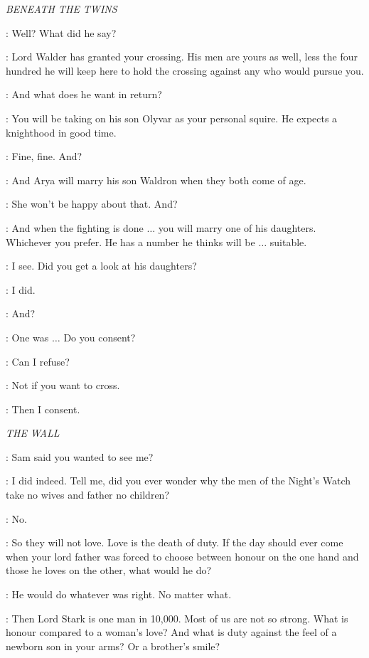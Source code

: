 \scene

\textit{BENEATH THE TWINS} 


\ROBB: Well? What did he say? 

\CATELYN: Lord Walder has granted your crossing. His men are yours as well, less the four hundred he will keep here to hold the crossing against any who would pursue you. 

\ROBB: And what does he want in return? 

\CATELYN: You will be taking on his son Olyvar as your personal squire. He expects a knighthood in good time. 

\ROBB: Fine, fine. And? 

\CATELYN: And Arya will marry his son Waldron when they both come of age. 

\ROBB: She won't be happy about that. And? 

\CATELYN: And when the fighting is done $\ldots$ you will marry one of his daughters. Whichever you prefer. He has a number he thinks will be $\ldots$ suitable. 

\ROBB: I see. Did you get a look at his daughters? 

\CATELYN: I did. 

\ROBB: And? 

\CATELYN: One was $\ldots$ Do you consent? 

\ROBB: Can I refuse? 

\CATELYN: Not if you want to cross. 

\ROBB: Then I consent. 


\scene

\textit{THE WALL} 


\JON: Sam said you wanted to see me? 

\AEMON: I did indeed.  Tell me, did you ever wonder why the men of the Night's Watch take no wives and father no children? 

\JON: No. 

\AEMON: So they will not love. Love is the death of duty. If the day should ever come when your lord father was forced to choose between honour on the one hand and those he loves on the other, what would he do? 

\JON: He would do whatever was right. No matter what. 

\AEMON: Then Lord Stark is one man in 10,000. Most of us are not so strong. What is honour compared to a woman's love? And what is duty against the feel of a newborn son in your arms? Or a brother's smile? 

